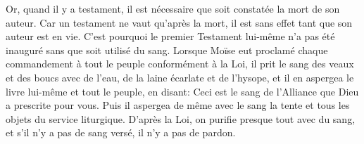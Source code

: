 Or, quand il y a testament,
	il est nécessaire que soit constatée la mort de son auteur.
Car un testament ne vaut qu’après la mort,
	il est sans effet tant que son auteur est en vie.
C’est pourquoi le premier Testament lui-même n’a pas été inauguré
	sans que soit utilisé du sang.
Lorsque Moïse eut proclamé chaque commandement à tout le peuple
		conformément à la Loi,
	il prit le sang des veaux et des boucs avec de l’eau,
	de la laine écarlate et de l’hysope,
	et il en aspergea le livre lui-même et tout le peuple,
	en disant: Ceci est le sang de l’Alliance que Dieu a prescrite pour vous.
Puis il aspergea de même avec le sang
	la tente et tous les objets du service liturgique.
D’après la Loi, on purifie presque tout avec du sang,
	et s’il n’y a pas de sang versé, il n’y a pas de pardon.
